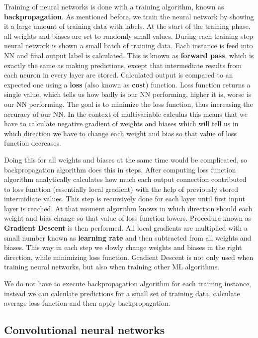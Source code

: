 Training of neural networks is done with a training algorithm, known as \textbf{backpropagation}.
As mentioned before, we train the neural network by showing it a large amount of training data with labels.
At the start of the training phase, all weights and biases are set to randomly small values.
During each training step neural network is shown a small batch of training data. 
Each instance is feed into NN and final output label is calculated.
This is known as \textbf{forward pass}, which is exactly the same as making predictions, except that intermediate results from each neuron in every layer are stored.
Calculated output is compared to an expected one using a \textbf{loss} (also known as \textbf{cost}) function.
Loss function returns a single value, which tells us how badly is our NN performing, higher it is, worse is our NN performing.
The goal is to minimize the loss function, thus increasing the accuracy of our NN.
In the context of multivariable calculus this means that we have to calculate negative gradient of weights and biases which will tell us in which direction we have to change each weight and bias so that value of loss function decreases. 

Doing this for all weights and biases at the same time would be complicated, so backpropagation algorithm does this in steps.
After computing loss function algorithm analytically calculates how much each output connection contributed to loss function (essentially local gradient) with the help of previously stored intermidiate values.
This step is recursively done for each layer until first input layer is reached.
At that moment algorithm knows in which direction should each weight and bias change so that value of loss function lowers.
Procedure known as \textbf{Gradient Descent} is then performed.
All local gradients are multiplied with a small number known as \textbf{learning rate} and then subtracted from all weights and biases.
This way in each step we slowly change weights and biases in the right direction, while minimizing loss function.
Gradient Descent is not only used when training neural networks, but also when training other ML algorithms.

We do not have to execute backpropagation algorithm for each training instance, instead we can calculate predictions for a small set of training data, calculate average loss function and then apply backpropagation.


\subsection{ Convolutional neural networks}

